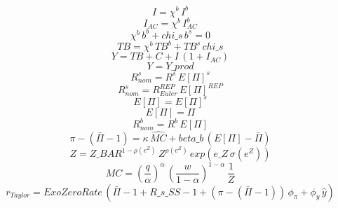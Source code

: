 \begin{dmath}
{I}={\chi^b }\, {I^b}
\end{dmath}
\begin{dmath}
{I_{AC}}={\chi^b }\, {I_{AC}^b}
\end{dmath}
\begin{dmath}
{\chi^b }\, {b^b}+{chi\_s}\, {b^s}=0
\end{dmath}
\begin{dmath}
{TB}={\chi^b }\, {TB^b}+{TB^s}\, {chi\_s}
\end{dmath}
\begin{dmath}
{Y}={TB}+{C}+{I}\, \left(1+{I_{AC}}\right)
\end{dmath}
\begin{dmath}
{Y}={Y\_prod}
\end{dmath}
\begin{dmath}
{ R^s_{nom}}={R^s}\, { E[\Pi]^{s} }
\end{dmath}
\begin{dmath}
{ R^s_{nom}}={ R^{REP}_{Euler} }\, { E[\Pi]^{REP} }
\end{dmath}
\begin{dmath}
{ E[\Pi] }={ E[\Pi]^{s} }
\end{dmath}
\begin{dmath}
{ E[\Pi] }={ \Pi }
\end{dmath}
\begin{dmath}
{ R^b_{nom}}={R^b}\, { E[\Pi] }
\end{dmath}
\begin{dmath}
{ \pi }-\left({ \bar{\Pi} }-1\right)={\kappa}\, { \hat{MC} }+{beta\_b}\, \left({ E[\Pi] }-{ \bar{\Pi} }\right)
\end{dmath}
\begin{dmath}
{Z}={Z\_BAR}^{1-{ \rho(e^Z) }}\, {Z}^{{ \rho(e^Z) }}\, exp\left({e\_Z}\, { \sigma(e^Z) }\right)
\end{dmath}
\begin{dmath}
{MC}=\left(\frac{{q}}{{\alpha }}\right)^{{\alpha }}\, \left(\frac{{w}}{1-{\alpha }}\right)^{1-{\alpha }}\, \frac{1}{{Z}}
\end{dmath}
\begin{dmath}
{ r_{Taylor} }={ExoZeroRate}\, \left({ \bar{\Pi} }-1+{R\_s\_SS}-1+\left({ \pi }-\left({ \bar{\Pi} }-1\right)\right)\, {\phi_{\pi}}+{\phi_{y}}\, { \hat{y} }\right)
\end{dmath}
